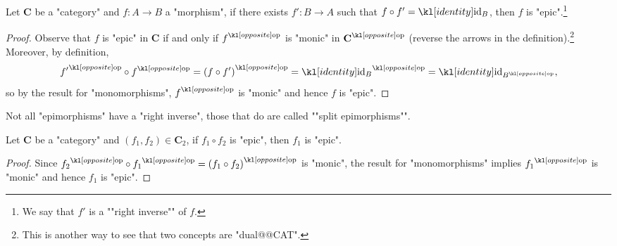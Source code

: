\documentclass[main.tex]{subfiles}
\begin{document}
\begin{prop}\label{prop:ep1}
	Let $\mathbf{C}$ be a "category" and $f:A\rightarrow B$ a "morphism", if there exists $f': B\rightarrow A$ such that $f\circ f' = \id_B$, then $f$ is "epic".\footnote{\AP We say that $f'$ is a ""right inverse"" of $f$.}
\end{prop}
\begin{proof}
	Observe that $f$ is "epic" in $\mathbf{C}$ if and only if $\op{f}$ is "monic" in $\op{\mathbf{C}}$ (reverse the arrows in the definition).\footnote{This is another way to see that two concepts are "dual@@CAT".} Moreover, by definition, \[\op{f'} \circ \op{f} = \op{(f \circ f')} = \op{\id_B} = \id_{\op{B}},\] so by the result for "monomorphisms", $\op{f}$ is "monic" and hence $f$ is "epic". 
\end{proof}
\AP Not all "epimorphisms" have a "right inverse", those that do are called ""split epimorphisms"".
\begin{prop}
	Let $\mathbf{C}$ be a "category" and $(f_1, f_2) \in \mathbf{C}_2$, if $f_1 \circ f_2$ is "epic", then $f_1$ is "epic".
\end{prop}
\begin{proof}
	Since $\op{f_2} \circ \op{f_1} = \op{(f_1 \circ f_2)}$ is "monic", the result for "monomorphisms" implies $\op{f_1}$ is "monic" and hence $f_1$ is "epic".
\end{proof}
\end{document}
